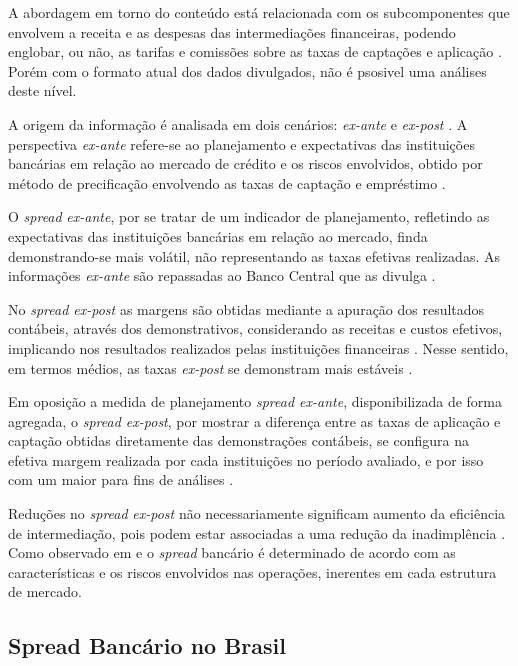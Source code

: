 \documentclass[
  12pt,
  12pt,
  openright,
  oneside,
  a4paper,
  chapter=TITLE,
  section=TITLE,
  subsection=TITLE,
  subsubsection=TITLE,
  english,
  portugues,
  sumario=tradicional]{abntex2}
\begin{document}
A abordagem em torno do conteúdo está relacionada com os subcomponentes que envolvem a receita e as despesas das intermediações financeiras, podendo englobar, ou não, as tarifas e comissões sobre as taxas de captações e aplicação \cite{block:2000}. Porém com o formato atual dos dados divulgados, não é psosivel uma análises deste nível.

A origem da informação é analisada em dois cenários: \emph{ex-ante} e \emph{ex-post} \cite{kunt:1999, levine:1997}. A perspectiva \emph{ex-ante} refere-se ao planejamento e expectativas das instituições bancárias em relação ao mercado de crédito e os riscos envolvidos, obtido por método de precificação envolvendo as taxas de captação e empréstimo \cite{durigan:2018, leal:2006, dantas:2012}.

O \emph{spread} \emph{ex-ante}, por se tratar de um indicador de planejamento, refletindo as expectativas das instituições bancárias em relação ao mercado, finda demonstrando-se mais volátil, não representando as taxas efetivas realizadas. As informações \emph{ex-ante} são repassadas ao Banco Central que as divulga \cite{durigan:2018, leal:2006, dantas:2012}.

No \emph{spread ex-post} as margens são obtidas mediante a apuração dos resultados contábeis, através dos demonstrativos, considerando as receitas e custos efetivos, implicando nos resultados realizados pelas instituições financeiras \cite{kunt:1999, durigan:2018}. Nesse sentido, em termos médios, as taxas \emph{ex-post} se demonstram mais estáveis \cite{leal:2006, dantas:2012}.

Em oposição a medida de planejamento \emph{spread ex-ante}, disponibilizada de forma agregada, o \emph{spread ex-post}, por mostrar a diferença entre as taxas de aplicação e captação obtidas diretamente das demonstrações contábeis, se configura na efetiva margem realizada por cada instituições no período avaliado, e por isso com um maior para fins de análises \cite{dantas:2012}.

Reduções no \emph{spread} \emph{ex-post} não necessariamente significam aumento da
eficiência de intermediação, pois podem estar associadas a uma
redução da inadimplência \cite{kunt:1999}. Como observado em
\textcite{klein:1971} e \textcite{ho-saunders:1981} o \emph{spread} bancário é
determinado de acordo com as características e os riscos envolvidos nas
operações, inerentes em cada estrutura de mercado.

\subsection{Spread Bancário no Brasil}
\end{document}
